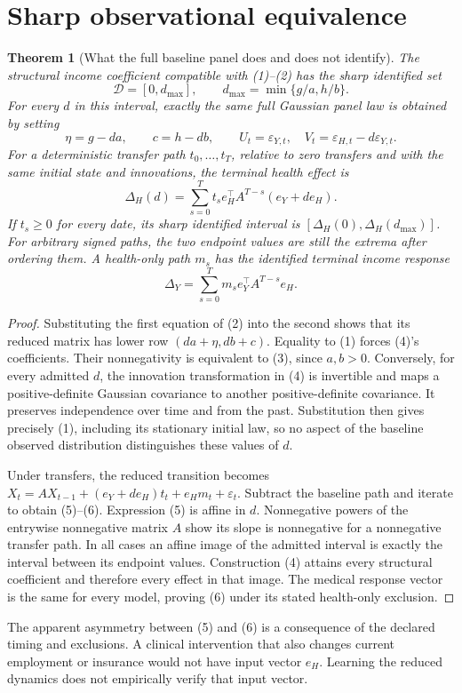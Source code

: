 \documentclass[11pt,a4paper]{article}
\newtheorem{theorem}{Theorem}[section]
\theoremstyle{remark}
\begin{document}
\section{Sharp observational equivalence}
\begin{theorem}[What the full baseline panel does and does not identify]
The structural income coefficient compatible with (1)--(2) has the sharp identified set
\[
 \mathcal D=[0,d_{\max}],\qquad
 d_{\max}=\min\{g/a,h/b\}. \tag{3}
\]
For every $d$ in this interval, exactly the same full Gaussian panel law is obtained by setting
\[
 \eta=g-da,\qquad c=h-db,\qquad
 U_t=\varepsilon_{Y,t},\quad
 V_t=\varepsilon_{H,t}-d\varepsilon_{Y,t}. \tag{4}
\]
For a deterministic transfer path $t_0,\ldots,t_T$, relative to zero transfers and with the same initial state and innovations, the terminal health effect is
\[
 \Delta_H(d)=\sum_{s=0}^T t_s e_H^\top A^{T-s}(e_Y+d e_H). \tag{5}
\]
If $t_s\ge0$ for every date, its sharp identified interval is $[\Delta_H(0),\Delta_H(d_{\max})]$. For arbitrary signed paths, the two endpoint values are still the extrema after ordering them. A health-only path $m_s$ has the identified terminal income response
\[
 \Delta_Y=\sum_{s=0}^T m_s e_Y^\top A^{T-s}e_H. \tag{6}
\]
\end{theorem}
\begin{proof}
Substituting the first equation of (2) into the second shows that its reduced matrix has lower row $(da+\eta,db+c)$. Equality to (1) forces (4)'s coefficients. Their nonnegativity is equivalent to (3), since $a,b>0$. Conversely, for every admitted $d$, the innovation transformation in (4) is invertible and maps a positive-definite Gaussian covariance to another positive-definite covariance. It preserves independence over time and from the past. Substitution then gives precisely (1), including its stationary initial law, so no aspect of the baseline observed distribution distinguishes these values of $d$.

Under transfers, the reduced transition becomes
$X_t=AX_{t-1}+(e_Y+de_H)t_t+e_Hm_t+\varepsilon_t$.
Subtract the baseline path and iterate to obtain (5)--(6). Expression (5) is affine in $d$. Nonnegative powers of the entrywise nonnegative matrix $A$ show its slope is nonnegative for a nonnegative transfer path. In all cases an affine image of the admitted interval is exactly the interval between its endpoint values. Construction (4) attains every structural coefficient and therefore every effect in that image. The medical response vector is the same for every model, proving (6) under its stated health-only exclusion.
\end{proof}
The apparent asymmetry between (5) and (6) is a consequence of the declared timing and exclusions. A clinical intervention that also changes current employment or insurance would not have input vector $e_H$. Learning the reduced dynamics does not empirically verify that input vector.
\end{document}
